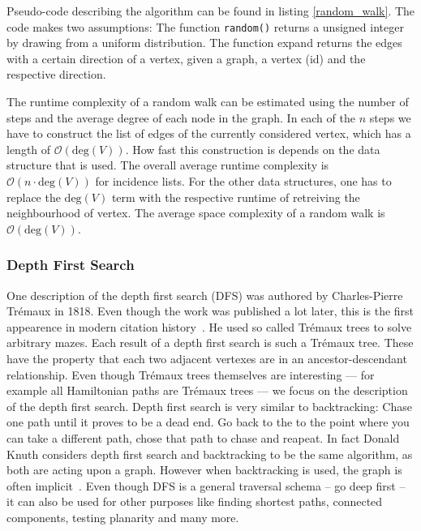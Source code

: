             Pseudo-code describing the algorithm can be found in listing \ref{random_walk}. 
            The code makes two assumptions: The function \texttt{random()} returns a unsigned integer by drawing from a uniform distribution. 
            The function expand returns the edges with a certain direction of a vertex, given a graph, a vertex (id) and the respective direction.
            
            The runtime complexity of a random walk can be estimated using the number of steps and the average degree of each node in the graph. 
            In each of the $n$ steps we have to construct the list of edges of the currently considered vertex, which has a length of $\mathcal{O}(\text{deg}(V))$. 
            How fast this construction is depends on the data structure that is used. 
            The overall average runtime complexity is $\mathcal{O}(n \cdot \text{deg}(V))$ for incidence lists. 
            For the other data structures, one has to replace the $\text{deg}(V)$ term with the respective runtime of retreiving the neighbourhood of vertex. 
            The average space complexity of a random walk is $\mathcal{O}(\text{deg}(V))$.

        \subsubsection*{Depth First Search}
            One description of the depth first search (DFS) was authored by Charles-Pierre Trémaux in 1818.
            Even though the work was published a lot later, this is the first appearence in modern citation history~\autocite{lucas1891recreations}. 
            He used so called Trémaux trees to solve arbitrary mazes. 
            Each result of a depth first search is such a Trémaux tree.
            These have the property that each two adjacent vertexes are in an ancestor-descendant relationship.
            Even though Trémaux trees themselves are interesting --- for example all Hamiltonian paths are Trémaux trees --- we focus on the description of the depth first search.        
            Depth first search is very similar to backtracking: Chase one path until it proves to be a dead end. 
            Go back to the to the point where you can take a different path, chose that path to chase and reapeat. 
            In fact Donald Knuth considers depth first search and backtracking to be the same algorithm, as both are acting upon a graph. 
            However when backtracking is used, the graph is often implicit~\autocite{Knuth2000DancingL}.        
            Even though DFS is a general traversal schema -- go deep first -- it can also be used for other purposes like finding shortest paths, connected components, testing planarity and many more. 
                    
